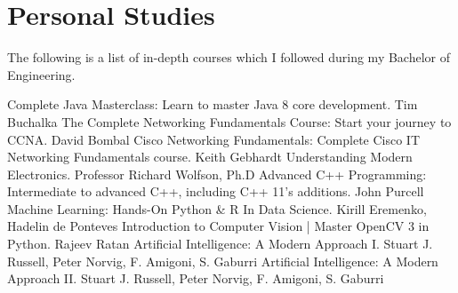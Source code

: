 \documentclass[]{friggeri-cv}
\begin{document}

\patchcmd{\entry}{11.8cm}{14.8cm}{}{}
\section{Personal Studies}
\vspace{-3mm}
The following is a list of in-depth courses which I followed during my Bachelor
of Engineering.

\begin{entrylist}
\entry
{}
{Complete Java Masterclass: {\normalfont\small{Learn to master Java 8 core development.}}}
{Tim Buchalka}
{\vspace{-3mm}}
\entry
{}
{The Complete Networking Fundamentals Course: {\normalfont\small{Start your journey to CCNA.}}}
{David Bombal}
{\vspace{-3mm}}
\entry
{}
{Cisco Networking Fundamentals: {\normalfont\small{Complete Cisco IT Networking Fundamentals course.}}}
{Keith Gebhardt}
{\vspace{-3mm}}
\entry
{}
{Understanding Modern Electronics{\normalfont\small{.}}}
{Professor Richard Wolfson, Ph.D}
{\vspace{-3mm}}
\entry
{}
{Advanced C++ Programming: {\normalfont\small{Intermediate to advanced C++, including C++ 11's additions.}}}
{John Purcell}
{\vspace{-3mm}}
\entry
{}
{Machine Learning: Hands-On Python \& R In Data Science{\normalfont\small{.}}}
{Kirill Eremenko, Hadelin de Ponteves}
{\vspace{-3mm}}
\entry
{}
{Introduction to Computer Vision | Master OpenCV 3 in Python{\normalfont\small{.}}}
{Rajeev Ratan}
{\vspace{-3mm}}
\entry
{}
{Artificial Intelligence: A Modern Approach I{\normalfont\small{.}}}
{Stuart J. Russell, Peter Norvig, F. Amigoni, S. Gaburri}
{\vspace{-3mm}}
\entry
{}
{Artificial Intelligence: A Modern Approach II{\normalfont\small{.}}}
{Stuart J. Russell, Peter Norvig, F. Amigoni, S. Gaburri}
{\vspace{-3mm}}
\end{entrylist}
\end{document}
